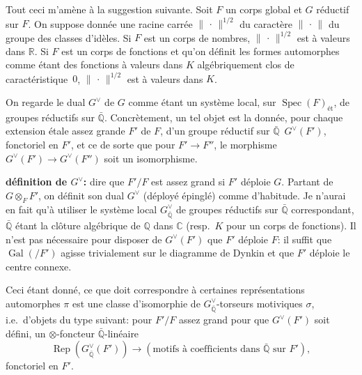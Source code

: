 \documentclass[11pt,a4paper]{article}
\theoremstyle{plain}
\theoremstyle{definition}
\DeclareMathOperator{\Spec}{Spec}
\DeclareMathOperator{\Gal}{Gal}
\DeclareMathOperator{\Rep}{Rep}
\newcommand{\norm}[1]{\lVert#1\rVert}
\begin{document}
Tout ceci m'am\`{e}ne \`{a} la suggestion suivante. Soit $F$ un corps global et $G$ r\'{e}ductif sur $F$. On suppose donn\'{e}e une racine carr\'{e}e $\norm{\,\cdot\,}^{1/2}$ du caract\`{e}re $\norm{\,\cdot\,}$ du groupe des classes d'id\`{e}les. Si $F$ est un corps de nombres, $\norm{\,\cdot\,}^{1/2}$ est \`{a} valeurs dans $\mathbb R$. Si $F$ est un corps de fonctions et qu'on d\'{e}finit les formes automorphes comme \'{e}tant des fonctions \`{a} valeurs dans $K$ alg\'{e}briquement clos de caract\'{e}ristique~$0$, $\norm{\,\cdot\,}^{1/2}$ est \`{a} valeurs dans $K$.

On regarde le dual $G^\vee$ de $G$ comme \'{e}tant un syst\`{e}me local, sur $\Spec(F)_{\text{\'et}}$, de groupes r\'{e}ductifs sur $\bar{\mathbb Q}$. Concr\`{e}tement, un tel objet est la donn\'{e}e, pour chaque extension \'{e}tale assez grande $F'$ de $F$, d'un groupe r\'{e}ductif sur $\bar{\mathbb Q}$ \,$G^\vee(F')$, fonctoriel en $F'$, et ce de sorte que pour $F' \to F''$, le morphisme $G^\vee(F') \to G^\vee(F'')$ soit un isomorphisme.

\textbf{d\'{e}finition de $G^\vee$:} dire que $F'/F$ est assez grand si $F'$ d\'{e}ploie $G$. Partant de $G \otimes_F F'$, on d\'{e}finit son dual $G^\vee$ (d\'{e}ploy\'{e} \'{e}pingl\'{e}) comme d'habitude. Je n'aurai en fait qu'\`{a} utiliser le syst\`{e}me local $G^\vee_{\bar{\mathbb Q}}$ de groupes r\'{e}ductifs sur $\bar{\mathbb Q}$ correspondant, $\bar{\mathbb Q}$ \'{e}tant la cl\^{o}ture alg\'{e}brique de $\mathbb Q$ dans $\mathbb C$ (resp.~$K$ pour un corps de fonctions). Il n'est pas n\'{e}cessaire pour disposer de $G^\vee(F')$ que $F'$ d\'{e}ploie $F$: il suffit que $\Gal(/F')$ agisse trivialement sur le diagramme de Dynkin et que $F'$ d\'{e}ploie le centre connexe.

Ceci \'{e}tant donn\'{e}, ce que doit correspondre \`{a} certaines repr\'{e}sentations automorphes $\pi$ est une classe d'isomorphie de $G^\vee_{\bar{\mathbb Q}}$-torseurs motiviques $\sigma$, i.e.~d'objets du type suivant: pour $F'/F$ assez grand pour que $G^\vee(F')$ soit d\'{e}fini, un $\otimes$-foncteur $\bar{\mathbb Q}$-lin\'{e}aire
\[
\Rep(G^\vee_{\bar{\mathbb Q}}(F')) \longrightarrow (\text{motifs \`{a} coefficients dans } \bar{\mathbb Q} \text{ sur } F'),
\]
fonctoriel en $F'$.
\end{document}
